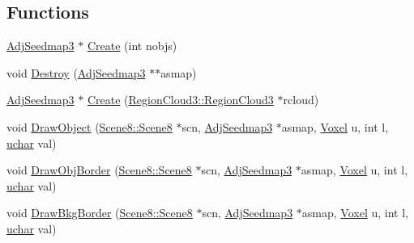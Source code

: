 \subsection*{Functions}
\begin{DoxyCompactItemize}
\item 
\hyperlink{namespacegft_1_1AdjSeedmap3_a5af15912c0c5243c6d835f204006b32a}{Adj\-Seedmap3} $\ast$ \hyperlink{namespacegft_1_1AdjSeedmap3_a977c53069645704d8aca5ad701fd9c73}{Create} (int nobjs)
\item 
void \hyperlink{namespacegft_1_1AdjSeedmap3_ac5dd804cffcd4f3baf11529ec11fafae}{Destroy} (\hyperlink{namespacegft_1_1AdjSeedmap3_a5af15912c0c5243c6d835f204006b32a}{Adj\-Seedmap3} $\ast$$\ast$asmap)
\item 
\hyperlink{namespacegft_1_1AdjSeedmap3_a5af15912c0c5243c6d835f204006b32a}{Adj\-Seedmap3} $\ast$ \hyperlink{namespacegft_1_1AdjSeedmap3_aa67ddef9f22370690967d2ad27658b93}{Create} (\hyperlink{namespacegft_1_1RegionCloud3_ae97ab7136c2a2a97ccc56e60025d0a1a}{Region\-Cloud3\-::\-Region\-Cloud3} $\ast$rcloud)
\item 
void \hyperlink{namespacegft_1_1AdjSeedmap3_a251b3f03f808c23edcb703d8d4cd5e30}{Draw\-Object} (\hyperlink{namespacegft_1_1Scene8_a78f9a172f8a505f9577adac7f85bc009}{Scene8\-::\-Scene8} $\ast$scn, \hyperlink{namespacegft_1_1AdjSeedmap3_a5af15912c0c5243c6d835f204006b32a}{Adj\-Seedmap3} $\ast$asmap, \hyperlink{namespacegft_a16db894075bb714f877a3c5733772db6}{Voxel} u, int l, \hyperlink{namespacegft_a6411e297d5ac5aa9b91a37da00952197}{uchar} val)
\item 
void \hyperlink{namespacegft_1_1AdjSeedmap3_aca3ea23679405a8dca191c368abf8534}{Draw\-Obj\-Border} (\hyperlink{namespacegft_1_1Scene8_a78f9a172f8a505f9577adac7f85bc009}{Scene8\-::\-Scene8} $\ast$scn, \hyperlink{namespacegft_1_1AdjSeedmap3_a5af15912c0c5243c6d835f204006b32a}{Adj\-Seedmap3} $\ast$asmap, \hyperlink{namespacegft_a16db894075bb714f877a3c5733772db6}{Voxel} u, int l, \hyperlink{namespacegft_a6411e297d5ac5aa9b91a37da00952197}{uchar} val)
\item 
void \hyperlink{namespacegft_1_1AdjSeedmap3_a0ae5c5616ceeb9ca3534493c55a5b948}{Draw\-Bkg\-Border} (\hyperlink{namespacegft_1_1Scene8_a78f9a172f8a505f9577adac7f85bc009}{Scene8\-::\-Scene8} $\ast$scn, \hyperlink{namespacegft_1_1AdjSeedmap3_a5af15912c0c5243c6d835f204006b32a}{Adj\-Seedmap3} $\ast$asmap, \hyperlink{namespacegft_a16db894075bb714f877a3c5733772db6}{Voxel} u, int l, \hyperlink{namespacegft_a6411e297d5ac5aa9b91a37da00952197}{uchar} val)
\item 
$$
\end{DoxyCompactItemize}
